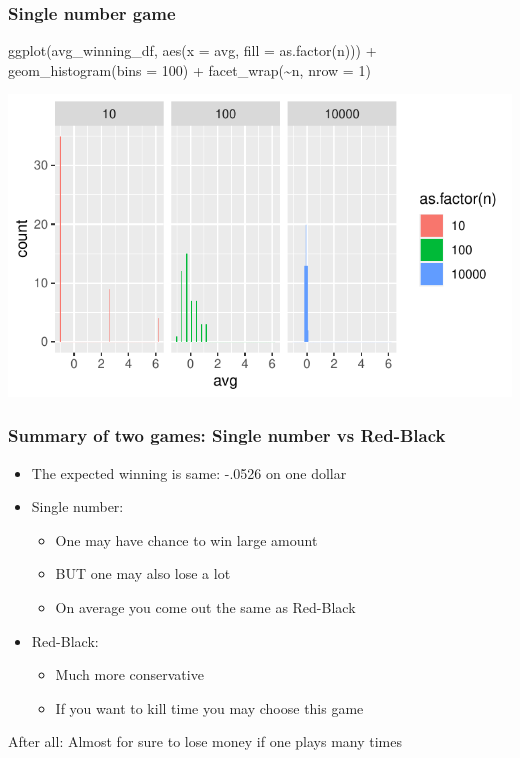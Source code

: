 \documentclass[
  ignorenonframetext,
]{beamer}
\newenvironment{Shaded}{\begin{snugshade}}{\end{snugshade}}
\newcommand{\AttributeTok}[1]{\textcolor[rgb]{0.77,0.63,0.00}{#1}}
\newcommand{\DecValTok}[1]{\textcolor[rgb]{0.00,0.00,0.81}{#1}}
\newcommand{\FunctionTok}[1]{\textcolor[rgb]{0.00,0.00,0.00}{#1}}
\newcommand{\NormalTok}[1]{#1}
\newcommand{\SpecialCharTok}[1]{\textcolor[rgb]{0.00,0.00,0.00}{#1}}
\providecommand{\tightlist}{%
  \setlength{\itemsep}{0pt}\setlength{\parskip}{0pt}}
\begin{document}
\begin{frame}[fragile]
\frametitle{Single number game}
\tiny

\begin{Shaded}
\begin{Highlighting}[]
\FunctionTok{ggplot}\NormalTok{(avg\_winning\_df, }\FunctionTok{aes}\NormalTok{(}\AttributeTok{x =}\NormalTok{ avg, }\AttributeTok{fill =} \FunctionTok{as.factor}\NormalTok{(n))) }\SpecialCharTok{+} 
  \FunctionTok{geom\_histogram}\NormalTok{(}\AttributeTok{bins =} \DecValTok{100}\NormalTok{) }\SpecialCharTok{+}
  \FunctionTok{facet\_wrap}\NormalTok{(}\SpecialCharTok{\textasciitilde{}}\NormalTok{n, }\AttributeTok{nrow =} \DecValTok{1}\NormalTok{)}
\end{Highlighting}
\end{Shaded}

\begin{center}\includegraphics[width=0.9\linewidth]{Probability_Statistics_101_v2_files/figure-beamer/unnamed-chunk-14-1} \end{center}
\end{frame}

\begin{frame}
\frametitle{Summary of two games:  Single number vs Red-Black}

\begin{itemize}
\tightlist
\item
  The expected winning is same: -.0526 on one dollar
\item
  Single number:

  \begin{itemize}
  \tightlist
  \item
    One may have chance to win large amount
  \item
    BUT one may also lose a lot
  \item
    On average you come out the same as Red-Black
  \end{itemize}
\item
  Red-Black:

  \begin{itemize}
  \tightlist
  \item
    Much more conservative
  \item
    If you want to kill time you may choose this game
  \end{itemize}
\end{itemize}

After all: Almost for sure to lose money if one plays many times
\end{frame}
\end{document}
